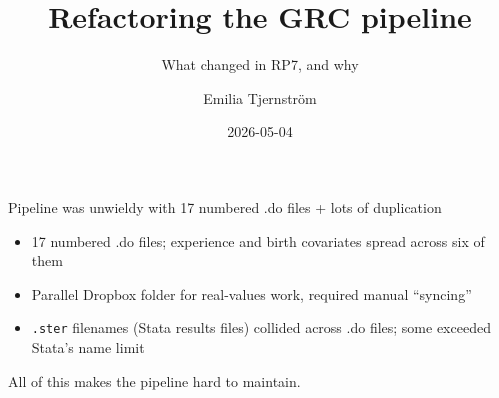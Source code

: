\documentclass[10pt,aspectratio=169]{beamer}
\title{Refactoring the GRC pipeline}
\subtitle{What changed in RP7, and why}
\author{Emilia Tjernstr{\"o}m}
\date{2026-05-04}
\newcommand{\code}[1]{\texttt{\small #1}}
\begin{document}
\maketitle

\begin{frame}{Pipeline was unwieldy with 17 numbered .do files + lots of duplication}

\begin{itemize}\setlength\itemsep{4pt}
    \item 17 numbered .do files; experience and birth covariates spread across six of them
    \item Parallel Dropbox folder for real-values work, required manual ``syncing''
    \item \code{.ster} filenames (Stata results files) collided across .do files; some exceeded Stata's name limit
\end{itemize}

\bigskip
All of this makes the pipeline hard to maintain.

\end{frame}
\end{document}
